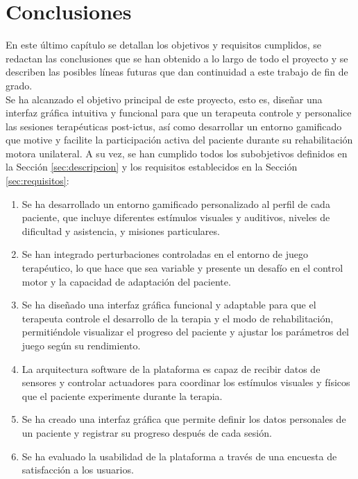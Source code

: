 \chapter{Conclusiones}
\label{cap:capitulo5}

En este último capítulo se detallan los objetivos y requisitos cumplidos, se redactan las conclusiones que se han obtenido a lo largo de todo el proyecto y se describen las posibles líneas futuras que dan continuidad a este trabajo de fin de grado.\\

Se ha alcanzado el objetivo principal de este proyecto, esto es, diseñar una interfaz gráfica intuitiva y funcional para que un terapeuta controle y personalice las sesiones terapéuticas post-ictus, así como desarrollar un entorno gamificado que motive y facilite la participación activa del paciente durante su rehabilitación motora unilateral.
A su vez, se han cumplido todos los subobjetivos definidos en la Sección \ref{sec:descripcion} y los requisitos establecidos en la Sección \ref{sec:requisitos}:
\begin{enumerate}
    \item Se ha desarrollado un entorno gamificado personalizado al perfil de cada paciente, que incluye diferentes estímulos visuales y auditivos, niveles de dificultad y asistencia, y misiones particulares.
    \item Se han integrado perturbaciones controladas en el entorno de juego terapéutico, lo que hace que sea variable y presente un desafío en el control motor y la capacidad de adaptación del paciente.
    \item Se ha diseñado una interfaz gráfica funcional y adaptable para que el terapeuta controle el desarrollo de la terapia y el modo de rehabilitación, permitiéndole visualizar el progreso del paciente y ajustar los parámetros del juego según su rendimiento.
    \item La arquitectura software de la plataforma es capaz de recibir datos de sensores y controlar actuadores para coordinar los estímulos visuales y físicos que el paciente experimente durante la terapia.
    \item Se ha creado una interfaz gráfica que permite definir los datos personales de un paciente y registrar su progreso después de cada sesión.
    \item Se ha evaluado la usabilidad de la plataforma a través de una encuesta de satisfacción a los usuarios.
\end{enumerate}\

